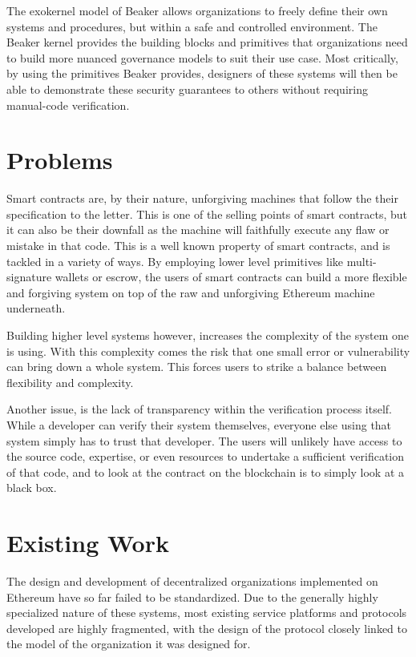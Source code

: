 \documentclass[english,a4paper]{article}
\begin{document}
The exokernel model of Beaker allows organizations to freely define
their own systems and procedures, but within a safe and controlled
environment. The Beaker kernel provides the building blocks and
primitives that organizations need to build more nuanced governance
models to suit their use case. Most critically, by using the primitives
Beaker provides, designers of these systems will then be able to
demonstrate these security guarantees to others without requiring
manual-code verification.

\section{Problems}\label{problems}
Smart contracts are, by their nature, unforgiving machines that follow
the their specification to the letter. This is one of the selling points
of smart contracts, but it can also be their downfall as the machine
will faithfully execute any flaw or mistake in that code. This is a well
known property of smart contracts, and is tackled in a variety of ways.
By employing lower level primitives like multi-signature wallets or
escrow, the users of smart contracts can build a more flexible and
forgiving system on top of the raw and unforgiving Ethereum machine
underneath.

Building higher level systems however, increases the complexity of the
system one is using. With this complexity comes the risk that one small
error or vulnerability can bring down a whole system. This forces users
to strike a balance between flexibility and complexity.

Another issue, is the lack of transparency within the verification
process itself. While a developer can verify their system themselves,
everyone else using that system simply has to trust that developer. The
users will unlikely have access to the source code, expertise, or even
resources to undertake a sufficient verification of that code, and to
look at the contract on the blockchain is to simply look at a black box.

\section{Existing Work}\label{existing-work}
The design and development of decentralized organizations implemented on
Ethereum have so far failed to be standardized. Due to the generally
highly specialized nature of these systems, most existing service
platforms and protocols developed are highly fragmented, with the design
of the protocol closely linked to the model of the organization it was
designed for.
\end{document}
